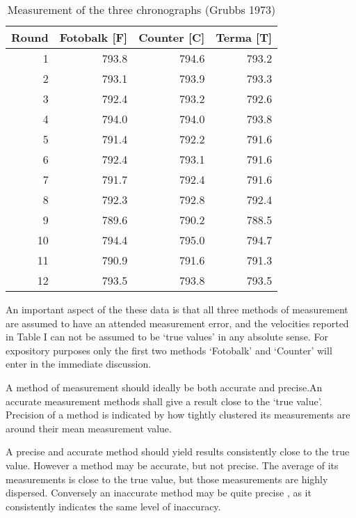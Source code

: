 \documentclass{report}
\begin{document}
\begin{table}[ht]
	\begin{center}
		\begin{tabular}{rrrr}
			\hline
			Round& Fotobalk [F] & Counter [C]& Terma [T]\\
			\hline
			1 & 793.8 & 794.6 & 793.2 \\
			2 & 793.1 & 793.9 & 793.3 \\
			3 & 792.4 & 793.2 & 792.6 \\
			4 & 794.0 & 794.0 & 793.8 \\
			5 & 791.4 & 792.2 & 791.6 \\
			6 & 792.4 & 793.1 & 791.6 \\
			7 & 791.7 & 792.4 & 791.6 \\
			8 & 792.3 & 792.8 & 792.4 \\
			9 & 789.6 & 790.2 & 788.5 \\
			10 & 794.4 & 795.0 & 794.7 \\
			11 & 790.9 & 791.6 & 791.3 \\
			12 & 793.5 & 793.8 & 793.5 \\
			\hline
		\end{tabular}
		\caption{Measurement of the three chronographs (Grubbs 1973)}
	\end{center}
\end{table}

An important aspect of the these data is that all three methods of
measurement are assumed to have an attended measurement error, and
the velocities reported in Table I can not be assumed to be `true
values' in any absolute sense. For expository purposes only the
first two methods `Fotobalk' and `Counter' will enter in the
immediate discussion.


A method of measurement should ideally be both accurate and
precise.An accurate measurement methods shall give a result close
to the `true value'. Precision of a method is indicated by how
tightly clustered its measurements are around their mean
measurement value.

\newpage

A precise and accurate method should yield results consistently
close to the true value. However a method may be accurate, but not
precise. The average of its measurements is close to the true
value, but those measurements are highly dispersed. Conversely an
inaccurate method may be quite precise , as it consistently
indicates the same level of inaccuracy.
\end{document}
